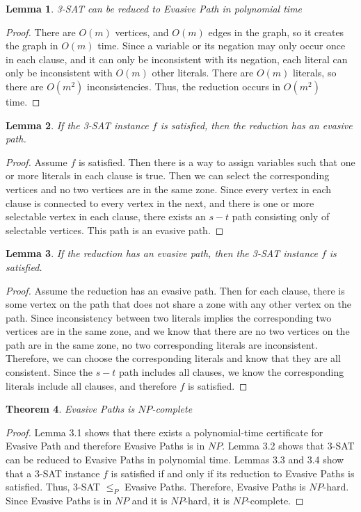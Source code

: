 \documentclass{article}
\newtheorem{theorem}{Theorem}[section]
\newtheorem{lemma}[theorem]{Lemma}
\begin{document}
\begin{lemma}
3-SAT can be reduced to Evasive Path in polynomial time
\end{lemma}
\begin{proof}
There are $O(m)$ vertices, and $O(m)$ edges in the graph, so it creates the graph in $O(m)$ time. Since a variable or its negation may only occur once in each clause, and it can only be inconsistent with its negation, each literal can only be inconsistent with $O(m)$ other literals. There are $O(m)$ literals, so there are $O(m^2)$ inconsistencies. Thus, the reduction occurs in $O(m^2)$ time.
\end{proof}

\begin{lemma}
If the 3-SAT instance $f$ is satisfied, then the reduction has an evasive path.
\end{lemma}
\begin{proof}
Assume $f$ is satisfied. Then there is a way to assign variables such that one or more literals in each clause is true. Then we can select the corresponding vertices and no two vertices are in the same zone. Since every vertex in each clause is connected to every vertex in the next, and there is one or more selectable vertex in each clause, there exists an $s-t$ path consisting only of selectable vertices. This path is an evasive path.
\end{proof}

\begin{lemma}
If the reduction has an evasive path, then the 3-SAT instance $f$ is satisfied.
\end{lemma}
\begin{proof}
Assume the reduction has an evasive path. Then for each clause, there is some vertex on the path that does not share a zone with any other vertex on the path. Since inconsistency between two literals implies the corresponding two vertices are in the same zone, and we know that there are no two vertices on the path are in the same zone, no two corresponding literals are inconsistent. Therefore, we can choose the corresponding literals and know that they are all consistent. Since the $s-t$ path includes all clauses, we know the corresponding literals include all clauses, and therefore $f$ is satisfied.
\end{proof}

\begin{theorem}
Evasive Paths is $NP$-complete
\end{theorem}
\begin{proof}
Lemma 3.1 shows that there exists a polynomial-time certificate for Evasive Path and therefore Evasive Paths is in $NP$. Lemma 3.2 shows that 3-SAT can be reduced to Evasive Paths in polynomial time. Lemmas 3.3 and 3.4 show that a 3-SAT instance $f$ is satisfied if and only if its reduction to Evasive Paths is satisfied. Thus, 3-SAT $\leq_P$ Evasive Paths. Therefore, Evasive Paths is $NP$-hard. Since Evasive Paths is in $NP$ and it is $NP$-hard, it is $NP$-complete.
\end{proof}
\end{document}
